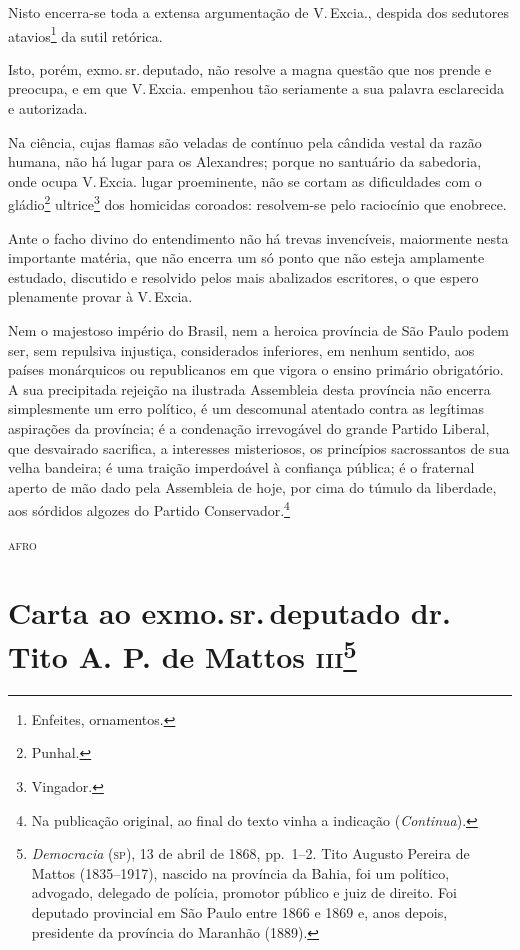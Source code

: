 Nisto encerra-se toda a extensa argumentação de V.\,Excia., despida dos
sedutores atavios\footnote{Enfeites, ornamentos.} da sutil retórica.

Isto, porém, exmo.\,sr.\,deputado, não resolve a magna questão que nos
prende e preocupa, e em que V.\,Excia. empenhou tão seriamente a sua
palavra esclarecida e autorizada.

Na ciência, cujas flamas são veladas de contínuo pela cândida vestal da
razão humana, não há lugar para os Alexandres; porque no santuário da
sabedoria, onde ocupa V.\,Excia. lugar proeminente, não se cortam as
dificuldades com o gládio\footnote{Punhal.} ultrice\footnote{
  Vingador.} dos homicidas coroados: resolvem-se pelo raciocínio que
enobrece.

Ante o facho divino do entendimento não há trevas invencíveis,
maiormente nesta importante matéria, que não encerra um só ponto que não
esteja amplamente estudado, discutido e resolvido pelos mais abalizados
escritores, o que espero plenamente provar à V.\,Excia.

Nem o majestoso império do Brasil, nem a heroica província de São Paulo
podem ser, sem repulsiva injustiça, considerados inferiores, em nenhum
sentido, aos países monárquicos ou republicanos em que vigora o ensino
primário obrigatório. A sua precipitada rejeição na ilustrada Assembleia
desta província não encerra simplesmente um erro político, é um
descomunal atentado contra as legítimas aspirações da província; é a
condenação irrevogável do grande Partido Liberal, que desvairado
sacrifica, a interesses misteriosos, os princípios sacrossantos de sua
velha bandeira; é uma traição imperdoável à confiança pública; é o
fraternal aperto de mão dado pela Assembleia de hoje, por cima do túmulo
da liberdade, aos sórdidos algozes do Partido Conservador.\footnote{Na publicação original, ao final do texto vinha a indicação (\emph{Continua}).}

\begin{flushright}
\textsc{afro}
\end{flushright}

\chapter{Carta ao exmo.\,sr.\,deputado dr.\,Tito A. P. de Mattos
\textsc{iii}\footnote{\emph{Democracia} (\textsc{sp}), 13 de abril de 1868, pp.~1--2.
  Tito Augusto Pereira de Mattos (1835--1917), nascido na província da
  Bahia, foi um político, advogado, delegado de polícia, promotor
  público e juiz de direito. Foi deputado provincial em São Paulo entre
  1866 e 1869 e, anos depois, presidente da província do Maranhão
  (1889).}}


